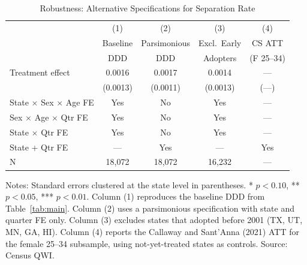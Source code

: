 \begin{table}[H]
\centering
\caption{Robustness: Alternative Specifications for Separation Rate}
\begin{threeparttable}
\begin{tabular}{lcccc}
\toprule
 & (1) & (2) & (3) & (4) \\
 & Baseline & Parsimonious & Excl.\ Early & CS ATT \\
 & DDD & DDD & Adopters & (F 25--34) \\
\midrule
Treatment effect & 0.0016 & 0.0017 & 0.0014 & --- \\
 & (0.0013) & (0.0011) & (0.0013) & (---) \\
\midrule
State $\times$ Sex $\times$ Age FE & Yes & No & Yes & --- \\
Sex $\times$ Age $\times$ Qtr FE & Yes & No & Yes & --- \\
State $\times$ Qtr FE & Yes & No & Yes & --- \\
State + Qtr FE & --- & Yes & --- & Yes \\
N & 18,072 & 18,072 & 16,232 & --- \\
\bottomrule
\end{tabular}
\begin{tablenotes}[flushleft]
\small
\item Notes: Standard errors clustered at the state level in parentheses.
* $p<0.10$, ** $p<0.05$, *** $p<0.01$.
Column (1) reproduces the baseline DDD from Table~\ref{tab:main}.
Column (2) uses a parsimonious specification with state and quarter FE only.
Column (3) excludes states that adopted before 2001 (TX, UT, MN, GA, HI).
Column (4) reports the Callaway and Sant'Anna (2021) ATT for the female 25--34 subsample,
using not-yet-treated states as controls.
Source: Census QWI.
\end{tablenotes}
\end{threeparttable}
\label{tab:robust}
\end{table}
